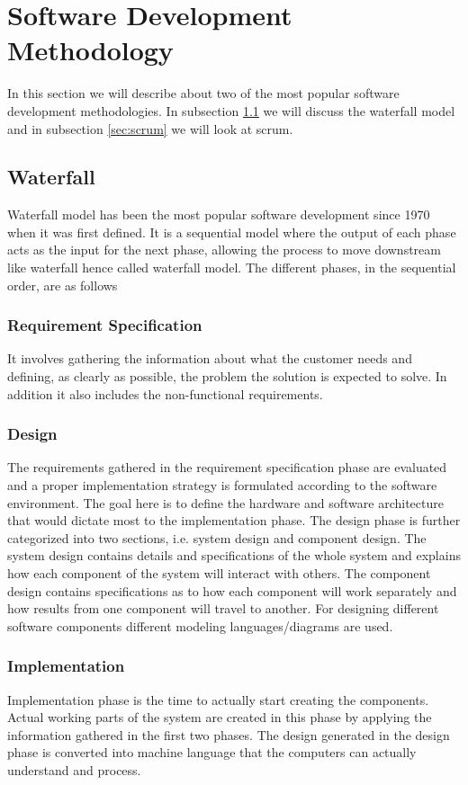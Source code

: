 \documentclass{report}
\begin{document}
\newpage
\section{Software Development Methodology}
In this section we will describe about two of the most popular software development methodologies. In subsection \ref{sec:waterfall} we will discuss the waterfall model and in subsection \ref{sec:scrum} we will look at scrum.

\subsection{Waterfall} \label{sec:waterfall}
Waterfall model has been the most popular software development since 1970 when it was first defined. It is a sequential model where the output of each phase acts as the input for the next phase, allowing the process to move downstream like waterfall hence called waterfall model. The different phases, in the sequential order, are as follows

\subsubsection{Requirement Specification}
It involves gathering the information about what the customer needs and defining, as clearly as possible, the problem the solution is expected to solve. In addition it also includes the non-functional requirements.

\subsubsection{Design}
The requirements gathered in the requirement specification phase are evaluated and a proper implementation strategy is formulated according to the software environment. The goal here is to define the hardware and software architecture that would dictate most to the implementation phase. The design phase is further categorized into two sections, i.e. system design and component design. The system design contains details and specifications of the whole system and explains how each component of the system will interact with others. The component design contains specifications as to how each component will work separately and how results from one component will travel to another. For designing different software components different modeling languages/diagrams are used.

\subsubsection{Implementation}
Implementation phase is the time to actually start creating the components. Actual working parts of the system are created in this phase by applying the information gathered in the first two phases. The design generated in the design phase is converted into machine language that the computers can actually understand and process.
\end{document}
